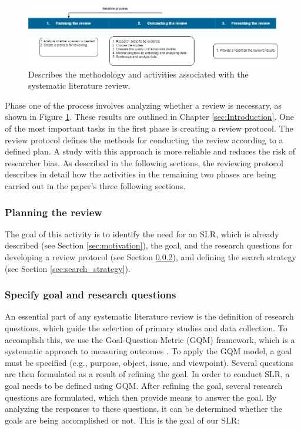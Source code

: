 \documentclass[a4paper,12pt]{article}
\begin{document}
\begin{figure}[H]
  \centering
  \includegraphics*[width=1\columnwidth]{img/Process for the systematic literature review}
  \caption{Describes the methodology and activities associated with the systematic literature review.}   
  \label{fig:methodology and activities associated with the literature review}
\end{figure}

Phase one of the process involves analyzing whether a review is necessary, as shown in Figure \ref{fig:methodology and activities associated with the literature review}. These results are outlined in Chapter \ref{sec:Introduction}. One of the most important tasks in the first phase is creating a review protocol. The review protocol defines the methods for conducting the review according to a defined plan. A study with this approach is more reliable and reduces the risk of researcher bias. As described in the following sections, the reviewing protocol describes in detail how the activities in the remaining two phases are being carried out in the paper's three following sections.

\subsubsection{Planning the review}
\label{sec:Planning the review}

\hspace{5mm} The goal of this activity is to identify the need for an SLR, which is already described (see Section \ref{sec:motivation}), the goal, and the research questions for developing a review protocol (see Section \ref{sec:goal_and_research}), and defining the search strategy (see Section \ref{sec:search_strategy}).

\subsubsection{Specify goal and research questions}
\label{sec:goal_and_research}

\hspace{5mm} An essential part of any systematic literature review is the definition of research questions, which guide the selection of primary studies and data collection. To accomplish this, we use the Goal-Question-Metric (GQM) framework, which is a systematic approach to measuring outcomes \cite{article36}. To apply the GQM model, a goal must be specified (e.g., purpose, object, issue, and viewpoint). Several questions are then formulated as a result of refining the goal. In order to conduct SLR, a goal needs to be defined using GQM. After refining the goal, several research questions are formulated, which then provide means to answer the goal. By analyzing the responses to these questions, it can be determined whether the goals are being accomplished or not. This is the goal of our SLR:
\end{document}

